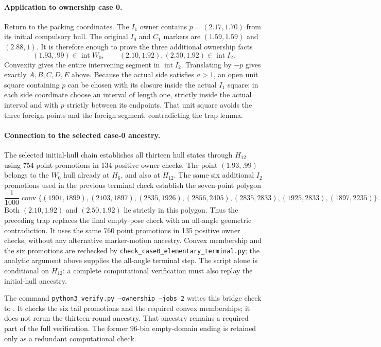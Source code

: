 \documentclass[11pt]{article}
\begin{document}
\paragraph{Application to ownership case 0.}
Return to the packing coordinates.  The $I_1$ owner contains
$p=(2.17,1.70)$ from its initial compulsory hull.  The original $I_0$
and $C_1$ markers are $(1.59,1.59)$ and $(2.88,1)$.
It is therefore enough to prove the three additional ownership facts
\[
 (1.93,.99)\in\operatorname{int}W_0,
 \qquad (2.10,1.92),(2.50,1.92)\in\operatorname{int}I_2.
\]
Convexity gives the entire intervening segment in $\operatorname{int}I_2$.
Translating by $-p$ gives exactly $A,B,C,D,E$ above.
Because the actual side satisfies $a>1$, an open unit square containing
$p$ can be chosen with its closure inside the actual $I_1$ square:
in each side coordinate choose an interval of length one, strictly
inside the actual interval and with $p$ strictly between its endpoints.
That unit square avoids the three foreign points and the foreign
segment, contradicting the trap lemma.

\paragraph{Connection to the selected case-0 ancestry.}
The selected initial-hull chain establishes all thirteen hull states
through $H_{12}$ using 754 point promotions in 134 positive owner checks.
The point $(1.93,.99)$ belongs to the $W_0$ hull already at $H_6$, and
also at $H_{12}$.  The same six additional $I_2$ promotions used in the
previous terminal check establish the seven-point polygon
\[
 \frac1{1000}\operatorname{conv}\{
 (1901,1899),(2103,1897),(2835,1926),(2856,2405),
 (2835,2833),(1925,2833),(1897,2235)\}.
\]
Both $(2.10,1.92)$ and $(2.50,1.92)$ lie strictly in this polygon.
Thus the preceding trap replaces the final empty-pose check with an
all-angle geometric contradiction.  It uses the same 760 point
promotions in 135 positive owner checks, without any alternative
marker-motion ancestry.  Convex membership and the six promotions are
rechecked by \texttt{check\_case0\_elementary\_terminal.py}; the analytic
argument above supplies the all-angle terminal step.  The script alone
is conditional on $H_{12}$: a complete computational verification must
also replay the initial-hull ancestry.

The command \texttt{python3 verify.py --ownership --jobs 2} writes this
bridge check to .
It checks the six tail promotions and the required convex memberships;
it does not rerun the thirteen-round ancestry. That ancestry remains a
required part of the full verification. The former $96$-bin empty-domain
ending is retained only as a redundant computational check.
\end{document}
